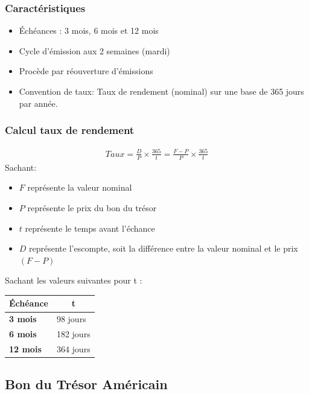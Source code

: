 \documentclass[letterpaper, 12pt]{article}
\newcommand{\1}{\mathds{1}}	%
\theoremstyle{definition}
\begin{document}
\subsubsection{Caractéristiques}
\begin{itemize}
\item Échéances : 3 mois,  6 mois et 12 mois
\item Cycle d’émission aux 2 semaines (mardi)
\item Procède par réouverture d’émissions
\item Convention de taux: Taux de rendement (nominal) sur une base de 365 jours par année.
\end{itemize}

\subsubsection{Calcul taux de rendement}
\begin{align*}
Taux = \frac{D}{P} \times \frac{365}{t}=\frac{F-P}{P} \times \frac{365}{t}
\end{align*}
Sachant:
\begin{itemize}
\item $F$ représente la valeur nominal 
\item $P$ représente le prix du bon du trésor 
\item $t$ représente le temps avant l'échance 
\item $D$ représente l'escompte, soit la différence entre la valeur nominal et le prix $(F-P)$
\end{itemize}

Sachant les valeurs suivantes pour t :
\begin{table}[H]
\centering
\begin{tabular}{@{}ll@{}}
\toprule
\textbf{Échéance} & \multicolumn{1}{c}{\textbf{t}} \\ \midrule
\textbf{3 mois}   & 98 jours                       \\
\textbf{6 mois}   & 182 jours                      \\
\textbf{12 mois}  & 364 jours                      \\ \bottomrule
\end{tabular}
\end{table}
\newpage
\subsection{Bon du Trésor Américain}
\end{document}
